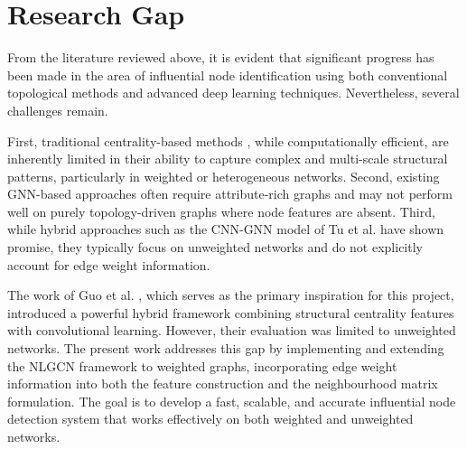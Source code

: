 \section{Research Gap}

From the literature reviewed above, it is evident that significant progress has been made in the area of influential node identification using both conventional topological methods and advanced deep learning techniques. Nevertheless, several challenges remain.

First, traditional centrality-based methods \cite{chen2012, farooq2018, mukhtar}, while computationally efficient, are inherently limited in their ability to capture complex and multi-scale structural patterns, particularly in weighted or heterogeneous networks. Second, existing GNN-based approaches \cite{patel2025, zhang2019gcn} often require attribute-rich graphs and may not perform well on purely topology-driven graphs where node features are absent. Third, while hybrid approaches such as the CNN-GNN model of Tu et al. \cite{tu2025} have shown promise, they typically focus on unweighted networks and do not explicitly account for edge weight information.

The work of Guo et al. \cite{guo2026}, which serves as the primary inspiration for this project, introduced a powerful hybrid framework combining structural centrality features with convolutional learning. However, their evaluation was limited to unweighted networks. The present work addresses this gap by implementing and extending the NLGCN framework to weighted graphs, incorporating edge weight information into both the feature construction and the neighbourhood matrix formulation. The goal is to develop a fast, scalable, and accurate influential node detection system that works effectively on both weighted and unweighted networks.
